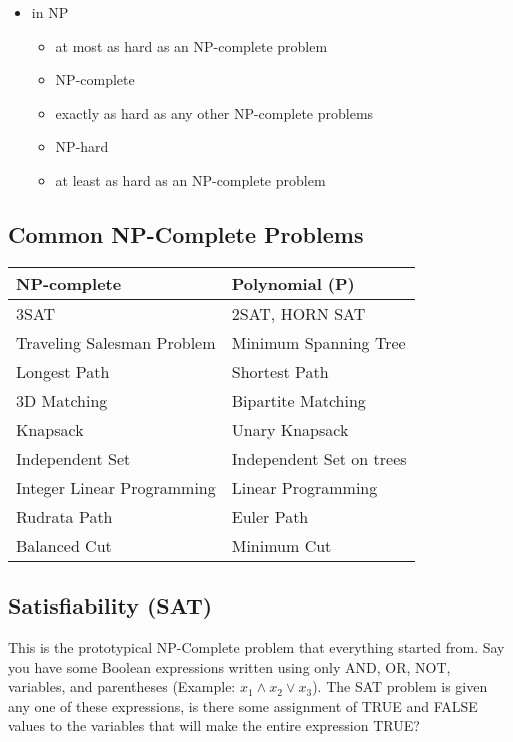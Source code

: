 \documentclass[landscape,7pt]{extarticle}
\begin{document}
\begin{multicols*}{3}
\begin{itemize}
    \item in NP
    \begin{itemize}
        \item at most as hard as an NP-complete problem
        \item NP-complete
        \item exactly as hard as any other NP-complete problems
        \item NP-hard
        \item at least as hard as an NP-complete problem
    \end{itemize}
\end{itemize}

\subsection*{Common NP-Complete Problems}


\begin{tabularx}{\linewidth}{l|X}
\toprule
\textbf{NP-complete} & \textbf{Polynomial (P)} \\
\midrule
3SAT & 2SAT, HORN SAT \\
Traveling Salesman Problem & Minimum Spanning Tree \\
Longest Path & Shortest Path \\
3D Matching & Bipartite Matching \\
Knapsack & Unary Knapsack \\
Independent Set & Independent Set on trees \\
Integer Linear Programming & Linear Programming \\
Rudrata Path & Euler Path \\
Balanced Cut & Minimum Cut \\
\bottomrule
\end{tabularx}



\subsection*{Satisfiability (SAT)}

This is the prototypical NP-Complete problem that everything started from. Say you have some Boolean expressions written using only AND, OR, NOT, variables, and parentheses (Example: $x_1 \wedge x_2 \vee x_3$). The SAT problem is given any one of these expressions, is there some assignment of TRUE and FALSE values to the variables that will make the entire expression TRUE?


\end{multicols*}
\end{document}
